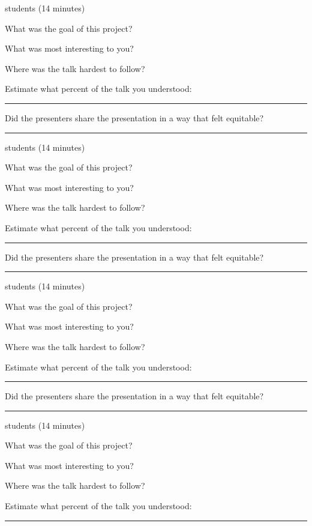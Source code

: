 \documentclass[12pt,letterpaper,noanswers]{exam}
\begin{document}
 students (14 minutes)
  
  \noindent What was the goal of this project?
\vfill
 
 \noindent What was most interesting to you?
\vfill
 
 \noindent Where was the talk hardest to follow?
\vfill
 
 \noindent Estimate what percent of the talk you understood:  \rule{0.5in}{0.5pt}
 
 \noindent Did the presenters share the presentation in a way that felt equitable?
\vfill
 
   \hrule
  \vspace{0.1cm}

 students (14 minutes)

 \noindent What was the goal of this project?
\vfill
 
 \noindent What was most interesting to you?
\vfill
 
 \noindent Where was the talk hardest to follow?
\vfill
 
 \noindent Estimate what percent of the talk you understood:  \rule{0.5in}{0.5pt}
 
 \noindent Did the presenters share the presentation in a way that felt equitable?
\vfill
 
 \hrule
  \vspace{0.1cm}
 
  students (14 minutes)
 
  \noindent What was the goal of this project?
\vfill
 
 \noindent What was most interesting to you?
\vfill
 
 \noindent Where was the talk hardest to follow?
\vfill
 
 \noindent Estimate what percent of the talk you understood:  \rule{0.5in}{0.5pt}
 
 \noindent Did the presenters share the presentation in a way that felt equitable?
\vfill
 

 
 \hrule
 \vspace{0.1cm}
  \eject
  
  students (14 minutes)
 
  \noindent What was the goal of this project?
\vfill
 
 \noindent What was most interesting to you?
\vfill
 
 \noindent Where was the talk hardest to follow?
\vfill
 
 \noindent Estimate what percent of the talk you understood:  \rule{0.5in}{0.5pt}
 
\end{document}
